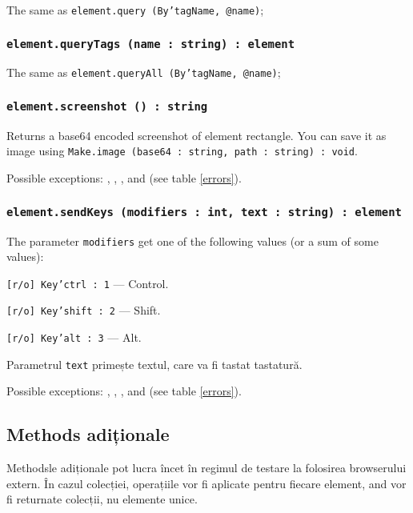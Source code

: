 The same as \texttt{element.query (By'tagName, @name)};

\subsubsection{\texttt{element.queryTags (name : string) : element}}

The same as \texttt{element.queryAll (By'tagName, @name)};

\subsubsection{\texttt{element.screenshot () : string}}

Returns a base64 encoded screenshot of element rectangle. You can save it as image using \texttt{Make.image (base64 : string, path : string) : void}.

Possible exceptions: , , ,  and  (see table \ref{errors}).

\subsubsection{\texttt{element.sendKeys (modifiers : int, text : string) : element}}

The parameter \texttt{modifiers} get one of the following values (or a sum of some values):
\begin{icItems}
	\item \texttt{[r/o] Key'ctrl : 1} — Control.
	\item \texttt{[r/o] Key'shift : 2} — Shift.
	\item \texttt{[r/o] Key'alt : 3} — Alt.
\end{icItems}

Parametrul \texttt{text} primește textul, care va fi tastat tastatură.

Possible exceptions: , , ,   and  (see table \ref{errors}).

\subsection{Methods adiționale}

Methodsle adiționale pot lucra încet în regimul de testare la folosirea browserului extern. În cazul colecției, operațiile vor fi aplicate pentru fiecare element, and vor fi returnate colecții, nu elemente unice. 

